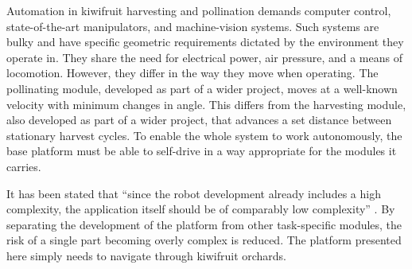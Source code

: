 \documentclass[preprint,authoryear,12pt]{elsarticle}
\begin{document}
    Automation in kiwifruit harvesting and pollination demands computer control, state-of-the-art manipulators, and machine-vision systems.
    Such systems are bulky and have specific geometric requirements dictated by the environment they operate in.
    They share the need for electrical power, air pressure, and a means of locomotion.
    However, they differ in the way they move when operating.
    The pollinating module, developed as part of a wider project, moves at a well-known velocity with minimum changes in angle.
    This differs from the harvesting module, also developed as part of a wider project, that advances a set distance between stationary harvest cycles.
    To enable the whole system to work autonomously, the base platform must be able to self-drive in a way appropriate for the modules it carries.

    It has been stated that ``since the robot development already includes a high complexity, the application itself should be of comparably low complexity'' \citep{Ruckelshausen2009}.
    By separating the development of the platform from other task-specific modules, the risk of a single part becoming overly complex is reduced.
    The platform presented here simply needs to navigate through kiwifruit orchards.
\end{document}
